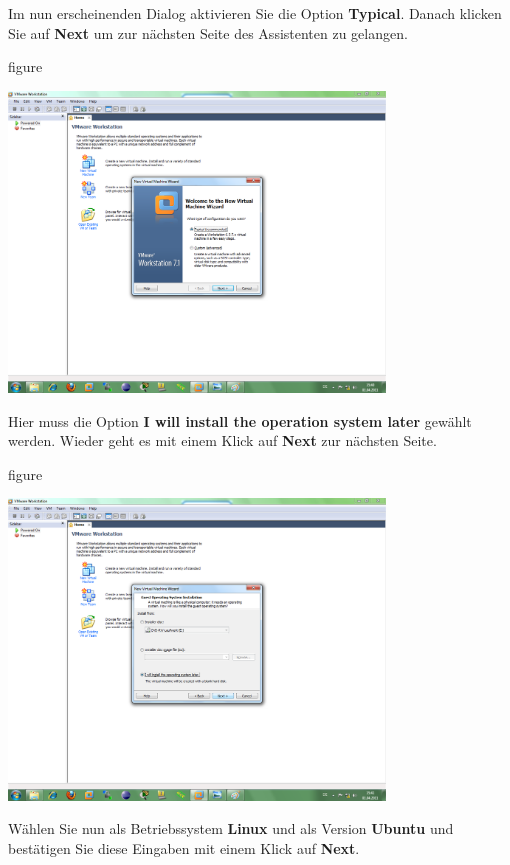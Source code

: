 Im nun erscheinenden Dialog aktivieren Sie die Option \textbf{Typical}. Danach klicken Sie auf \textbf{Next} um zur nächsten Seite des Assistenten
zu gelangen.

\begin{nofloat}{figure}
\begin{center}
\includegraphics[width=0.75\textwidth]{screenshots/vm02.png}
\end{center}
\end{nofloat}

Hier muss die Option \textbf{I will install the operation system later} gewählt werden. Wieder geht es mit einem
Klick auf \textbf{Next} zur nächsten Seite.

\begin{nofloat}{figure}
\begin{center}
\includegraphics[width=0.75\textwidth]{screenshots/vm03.png}
\end{center}
\end{nofloat}

Wählen Sie nun als Betriebssystem \textbf{Linux} und als Version \textbf{Ubuntu} und bestätigen Sie diese
Eingaben mit einem Klick auf \textbf{Next}.

